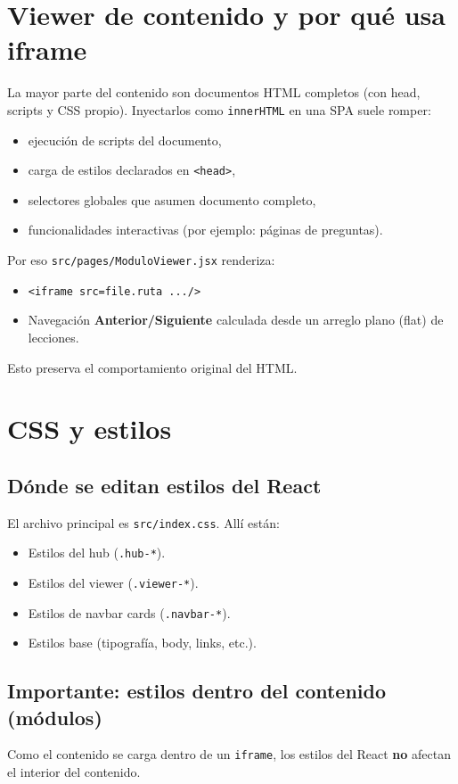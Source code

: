 \documentclass[12pt,a4paper]{article}
\begin{document}
\section{Viewer de contenido y por qu\'e usa iframe}
La mayor parte del contenido son documentos HTML completos (con head, scripts y CSS propio). Inyectarlos como \texttt{innerHTML} en una SPA suele romper:
\begin{itemize}[leftmargin=*]
  \item ejecuci\'on de scripts del documento,
  \item carga de estilos declarados en \texttt{<head>},
  \item selectores globales que asumen documento completo,
  \item funcionalidades interactivas (por ejemplo: p\'aginas de preguntas).
\end{itemize}

Por eso \texttt{src/pages/ModuloViewer.jsx} renderiza:
\begin{itemize}[leftmargin=*]
  \item \texttt{<iframe src={file.ruta} .../>}
  \item Navegaci\'on \textbf{Anterior/Siguiente} calculada desde un arreglo plano (flat) de lecciones.
\end{itemize}

Esto preserva el comportamiento original del HTML.

\section{CSS y estilos}
\subsection{D\'onde se editan estilos del React}
El archivo principal es \texttt{src/index.css}. All\'i est\'an:
\begin{itemize}[leftmargin=*]
  \item Estilos del hub (\texttt{.hub-*}).
  \item Estilos del viewer (\texttt{.viewer-*}).
  \item Estilos de navbar cards (\texttt{.navbar-*}).
  \item Estilos base (tipograf\'ia, body, links, etc.).
\end{itemize}

\subsection{Importante: estilos dentro del contenido (m\'odulos)}
Como el contenido se carga dentro de un \texttt{iframe}, los estilos del React \textbf{no} afectan el interior del contenido.
\end{document}
